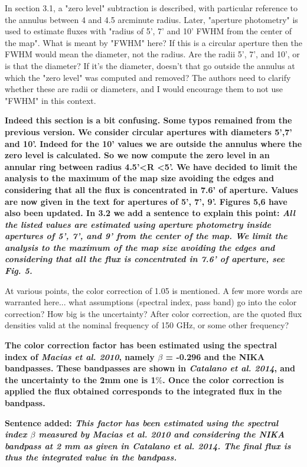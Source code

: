 \documentclass[12pt]{article}
\begin{document}
\begin{enumerate}
In section 3.1, a "zero level" subtraction is described, with 
particular reference to the annulus between 4 and 4.5 arcminute 
radius. Later, "aperture photometry" is used to estimate fluxes with 
"radius of 5', 7' and 10' FWHM from the center of the map". What is 
meant by "FWHM" here? If this is a circular aperture then the FWHM 
would mean the diameter, not the radius. Are the radii 5', 7', and 
10', or is that the diameter? If it's the diameter, doesn't that go 
outside the annulus at which the "zero level" was computed and 
removed? The authors need to clarify whether these are radii or 
diameters, and I would encourage them to not use "FWHM" in this 
context. 

\textbf{Indeed this section is a bit confusing. Some typos remained from the previous version.
  We consider circular apertures with diameters 5',7' and 10'.
  Indeed for the 10' values we are outside the annulus where the zero level is calculated. So we now compute the zero level in an annular ring between radius 4.5'\textless R \textless 5'. We have decided to limit the analysis to the maximum of the map size avoiding the edges and considering that all the flux is concentrated in 7.6' of aperture. Values are now given in the text for apertures of 5', 7', 9'. Figures 5,6 have also been updated. In 3.2 we add a sentence to explain this point: {\it All the listed values are estimated using aperture photometry inside apertures of 5', 7', and 9' from the center
of the map. We limit the analysis to the maximum of the map
size avoiding the edges and considering that all the flux is
concentrated in 7.6’ of aperture, see Fig. 5. 
}}

At various points, the color correction of 1.05 is mentioned. A few 
more words are warranted here... what assumptions (spectral index, 
pass band) go into the color correction? How big is the uncertainty? 
After color correction, are the quoted flux densities valid at the 
nominal frequency of 150 GHz, or some other frequency? 

\textbf{The color correction factor has been estimated using the spectral index of {\it Macias et al. 2010}, namely $\beta$ = -0.296 and the NIKA bandpasses. These bandpasses are shown in {\it Catalano et al. 2014}, and the uncertainty to the 2mm one is 1$\%$. Once the color correction is applied the flux obtained corresponds to the integrated flux in the bandpass.}

{\bf  Sentence added:
 {\it This factor has been estimated using the spectral index $\beta$ measured by {\it Macias et al. 2010} and considering the NIKA bandpass at 2 mm as given in {\it Catalano et al. 2014}. The final flux is thus the integrated value in the bandpass.}}


\end{enumerate}
\end{document}
